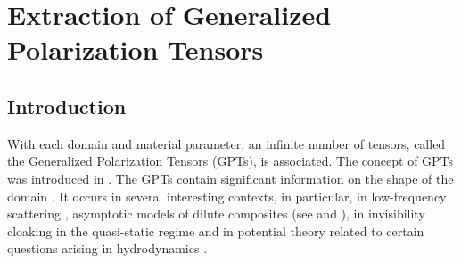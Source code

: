 \chapter[Extraction of Generalized Polarization Tensors]
{Extraction of Generalized Polarization Tensors
}

\label{chap:GPT-extraction}

\begin{abstract}
In order to recognize the shape of a target, we will need to develop tools
that are not available in the literature. This will not only help
us for the electrolocation problem, but it will also advance the more general
field of mathematical imaging and numerical inverse problems. Hence, in
chapters~\ref{chap:GPT-extraction}-\ref{chap:tracking}, we will take away from
the electrolocation problem to go to a canonical setting in electro-sensing.

In this chapter, we will develop tools to extract, from multi-static measurements,
physically relevant features called Generalized Polarization Tensors (GPTs).
The system has the remarkable property that low order generalized
polarization tensors are not affected by the error caused by  the
instability of higher orders in the presence of measurement noise.
This will later enables us to identify an object thanks to a dictionary
(chapter~\ref{chap:dico-matching}) and tracking it when moving (chapter~\ref{chap:tracking}).
We will study the full-view and partial-aperture problems, since they will be important
for later application on active electrolocation (chapter~\ref{chap:pnas}).
\end{abstract}

\section{Introduction}\label{sec:introduction}

With each domain and material parameter, an infinite number of
tensors, called the Generalized Polarization Tensors (GPTs), is
associated. The concept of GPTs was introduced in
\cite{ammarisima02, ammari2004reconstruction}. The GPTs contain significant information
on the shape of the domain \cite{AK_MMS_03}. It occurs in several
interesting contexts, in particular, in low-frequency scattering
\cite{dassios, ammari2004reconstruction}, asymptotic models of dilute composites (see
\cite{milton2002theory} and \cite{AKT_AA_05}), in invisibility cloaking in
the quasi-static regime \cite{AKLL11} and in potential theory
related to certain questions arising in hydrodynamics \cite{PS51}.

